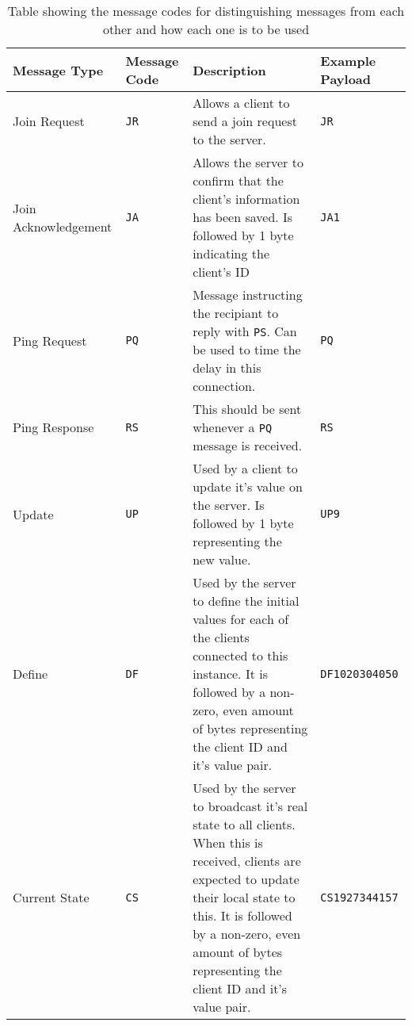 \begin{table}[t]
  \centering
  \begin{tabular}{ l l p{} l }
    \toprule
    Message Type & Message Code & Description & Example Payload \\
    \midrule
    Join Request &
      \lstinline[]$JR$ &
      Allows a client to send a join request to the server. &
      \lstinline[]$JR$ \\
    \addlinespace[10pt]
    Join Acknowledgement &
      \lstinline[]$JA$ &
      Allows the server to confirm that the client's information has been saved. Is followed by 1 byte indicating the client's ID &
      \lstinline[]$JA1$ \\
    \addlinespace[10pt]
    Ping Request &
      \lstinline[]$PQ$ &
      Message instructing the recipiant to reply with \lstinline[]$PS$. Can be used to time the delay in this connection.&
      \lstinline[]$PQ$ \\
    \addlinespace[10pt]
    Ping Response &
      \lstinline[]$RS$ &
      This should be sent whenever a \lstinline[]$PQ$ message is received. &
      \lstinline[]$RS$ \\
    \addlinespace[10pt]
    Update &
      \lstinline[]$UP$ &
      Used by a client to update it's value on the server. Is followed by 1 byte representing the new value. &
      \lstinline[]$UP9$ \\
    \addlinespace[10pt]
    Define &
      \lstinline[]$DF$ &
      Used by the server to define the initial values for each of the clients connected to this instance. It is followed by a non-zero, even amount of bytes representing the client ID and it's value pair. &
      \lstinline[]$DF1020304050$ \\
    \addlinespace[10pt]
    Current State &
      \lstinline[]$CS$ &
      Used by the server to broadcast it's real state to all clients. When this is received, clients are expected to update their local state to this. It is followed by a non-zero, even amount of bytes representing the client ID and it's value pair. &
      \lstinline[]$CS1927344157$ \\

    \bottomrule
  \end{tabular}
  \caption{Table showing the message codes for distinguishing messages from each other and how each one is to be used}
  \label{table:message-codes}
\end{table}
